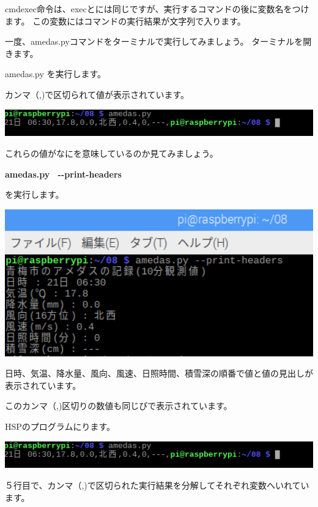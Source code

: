 \documentclass[a4paper,12pt,dvipdfmx]{jarticle}
\begin{document}
cmdexec命令は、execとには同じですが、実行するコマンドの後に変数名をつけます。
この変数にはコマンドの実行結果が文字列で入ります。

一度、amedas.pyコマンドをターミナルで実行してみましょう。
ターミナルを開きます。

amedas.py を実行します。

カンマ（,)で区切られて値が表示されています。

\begin{center}
\includegraphics[width=17.006cm]{textbook-img032-1.png}

\end{center}
これらの値がなにを意味しているのか見てみましょう。

\textbf{amedas.py \ {}-{}-print-headers}

を実行します。



\begin{center}
\includegraphics[width=17.006cm]{textbook-img032-2.png}

\end{center}
日時、気温、降水量、風向、風速、日照時間、積雪深の順番で値と値の見出しが表示されています。

このカンマ（,)区切りの数値も同じびで表示されています。

HSPのプログラムにります。

\begin{center}
\includegraphics[width=17.006cm]{textbook-img032-1.png}

\end{center}
５行目で、カンマ（,)で区切られた実行結果を分解してそれぞれ変数へいれています。
\end{document}
